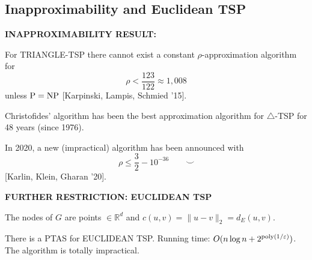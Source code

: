 \subsection{Inapproximability and Euclidean TSP}
\begin{notesresult}
\textbf{INAPPROXIMABILITY RESULT:}

For TRIANGLE-TSP there cannot exist a constant $\rho$-approximation algorithm for
\[\rho<\frac{123}{122}\approx1,008\]
unless $\mathrm{P}=\mathrm{NP}$ [Karpinski, Lampis, Schmied '15].
\end{notesresult}
\begin{notesresult}
Christofides' algorithm has been the best approximation algorithm for $\triangle$-TSP for 48 years (since 1976).

In 2020, a new (impractical) algorithm has been announced with
\[\rho\leq\frac32-10^{-36}\qquad\smile\]
[Karlin, Klein, Gharan '20].
\end{notesresult}
\begin{notesdefinition}
\textbf{FURTHER RESTRICTION: EUCLIDEAN TSP}

The nodes of $G$ are points $\in\mathbb R^d$ and
$c(u,v)=\lVert u-v\rVert_2=d_E(u,v)$.

There is a PTAS for EUCLIDEAN TSP.
Running time: $O(n\log n+2^{\operatorname{poly}(1/\varepsilon)})$.
The algorithm is totally impractical.
\end{notesdefinition}
